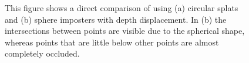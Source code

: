 \begin{figure}
\centering
{}
  
\caption{This figure shows a direct comparison of using (a) circular splats and (b) sphere imposters with depth displacement. In (b) the intersections between points are visible due to the spherical shape, whereas points that are little below other points are almost completely occluded.  }
\label{fig:point_sprites}
\end{figure}